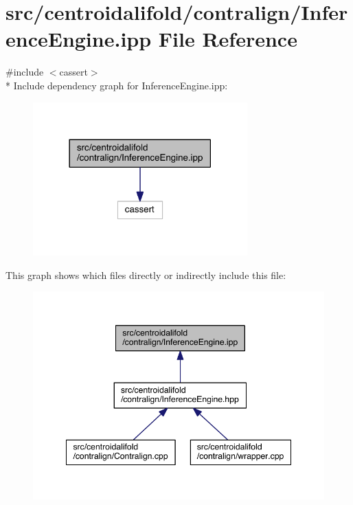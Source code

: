 \hypertarget{centroidalifold_2contralign_2_inference_engine_8ipp}{\section{src/centroidalifold/contralign/\+Inference\+Engine.ipp File Reference}
\label{centroidalifold_2contralign_2_inference_engine_8ipp}
}
{\ttfamily \#include $<$cassert$>$}\\*
Include dependency graph for Inference\+Engine.\+ipp\+:
\nopagebreak
\begin{figure}[H]
\begin{center}
\leavevmode
\includegraphics[width=234pt]{centroidalifold_2contralign_2_inference_engine_8ipp__incl}
\end{center}
\end{figure}
This graph shows which files directly or indirectly include this file\+:
\nopagebreak
\begin{figure}[H]
\begin{center}
\leavevmode
\includegraphics[width=348pt]{centroidalifold_2contralign_2_inference_engine_8ipp__dep__incl}
\end{center}
\end{figure}

